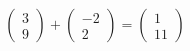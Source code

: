 \documentclass[preview]{standalone}
\begin{document}
\begin{align*}
\begin{pmatrix}3 \\ 9\end{pmatrix} + \begin{pmatrix}-2 \\ 2\end{pmatrix} = \begin{pmatrix}1 \\ 11\end{pmatrix}
\end{align*}
\end{document}
